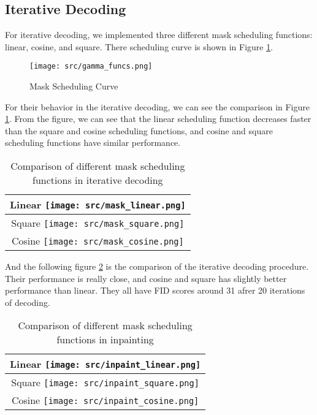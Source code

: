 \subsection{Iterative Decoding}

For iterative decoding, we implemented three different mask scheduling functions: linear, cosine, and square.
There scheduling curve is shown in Figure \ref{fig:mask_scheduling_curve}.

\begin{figure}[hb]
    \centering
    \texttt{[image: src/gamma\_funcs.png]}
    \caption{Mask Scheduling Curve}
    \label{fig:mask_scheduling_curve}
\end{figure}

For their behavior in the iterative decoding, we can see the comparison in Figure \ref{fig:mask_scheduling_comparison}.
From the figure, we can see that the linear scheduling function decreases faster than the square and cosine scheduling functions, and cosine and square scheduling functions have similar performance.

\begin{table}[hb]
    \centering
    \begin{tabular}{c}
        Linear
        \texttt{[image: src/mask\_linear.png]} \\
        \hline
        Square
        \texttt{[image: src/mask\_square.png]} \\
        \hline
        Cosine
        \texttt{[image: src/mask\_cosine.png]}
    \end{tabular}
    \caption{Comparison of different mask scheduling functions in iterative decoding}
    \label{fig:mask_scheduling_comparison}
\end{table}

And the following figure \ref{fig:inpainting_comparison} is the comparison of the iterative decoding procedure.
Their performance is really close, and cosine and square has slightly better performance than linear. They all have FID scores around 31 afrer 20 iterations of decoding.

\begin{table}[hb]
    \centering
    \begin{tabular}{c}
        Linear
        \texttt{[image: src/inpaint\_linear.png]} \\
        \hline
        Square
        \texttt{[image: src/inpaint\_square.png]} \\
        \hline
        Cosine
        \texttt{[image: src/inpaint\_cosine.png]}
    \end{tabular}
    \caption{Comparison of different mask scheduling functions in inpainting}
    \label{fig:inpainting_comparison}
\end{table}

